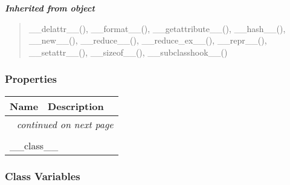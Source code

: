 \large{\textbf{\textit{Inherited from object}}}

\begin{quote}
\_\_delattr\_\_(), \_\_format\_\_(), \_\_getattribute\_\_(), \_\_hash\_\_(), \_\_new\_\_(), \_\_reduce\_\_(), \_\_reduce\_ex\_\_(), \_\_repr\_\_(), \_\_setattr\_\_(), \_\_sizeof\_\_(), \_\_subclasshook\_\_()
\end{quote}


  \subsubsection{Properties}

    \vspace{-1cm}
\hspace{\varindent}\begin{longtable}{|p{\varnamewidth}|p{\vardescrwidth}|l}
\cline{1-2}
\cline{1-2} \centering \textbf{Name} & \centering \textbf{Description}& \\
\cline{1-2}
\endhead\cline{1-2}\multicolumn{3}{r}{\small\textit{continued on next page}}\\\endfoot\cline{1-2}
\endlastfoot\multicolumn{2}{|l|}{\textit{Inherited from object}}\\
\multicolumn{2}{|p{\varwidth}|}{\raggedright \_\_class\_\_}\\
\cline{1-2}
\end{longtable}



  \subsubsection{Class Variables}

